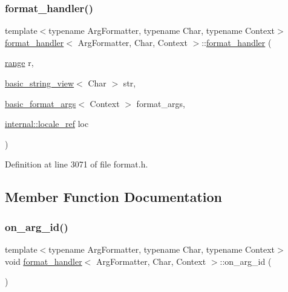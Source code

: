\subsubsection{\texorpdfstring{format\+\_\+handler()}{format\_handler()}}
{\footnotesize\ttfamily template$<$typename Arg\+Formatter, typename Char, typename Context$>$ \\
\hyperlink{structformat__handler}{format\+\_\+handler}$<$ Arg\+Formatter, Char, Context $>$\+::\hyperlink{structformat__handler}{format\+\_\+handler} (\begin{DoxyParamCaption}\item[{\hyperlink{structformat__handler_ac65f0cea520d6e2db8e8738bdbbfa246}{range}}]{r,  }\item[{\hyperlink{classbasic__string__view}{basic\+\_\+string\+\_\+view}$<$ Char $>$}]{str,  }\item[{\hyperlink{classbasic__format__args}{basic\+\_\+format\+\_\+args}$<$ Context $>$}]{format\+\_\+args,  }\item[{\hyperlink{classinternal_1_1locale__ref}{internal\+::locale\+\_\+ref}}]{loc }\end{DoxyParamCaption})\hspace{0.3cm}{\ttfamily [inline]}}



Definition at line 3071 of file format.\+h.



\subsection{Member Function Documentation}
\mbox{\label{structformat__handler_a68a3fd78bb89496cb6b27f67b0ecb168}} 
\subsubsection{\texorpdfstring{on\+\_\+arg\+\_\+id()}{on\_arg\_id()}\hspace{0.1cm}{\footnotesize\ttfamily [1/3]}}
{\footnotesize\ttfamily template$<$typename Arg\+Formatter, typename Char, typename Context$>$ \\
void \hyperlink{structformat__handler}{format\+\_\+handler}$<$ Arg\+Formatter, Char, Context $>$\+::on\+\_\+arg\+\_\+id (\begin{DoxyParamCaption}{ }\end{DoxyParamCaption})\hspace{0.3cm}{\ttfamily [inline]}}



